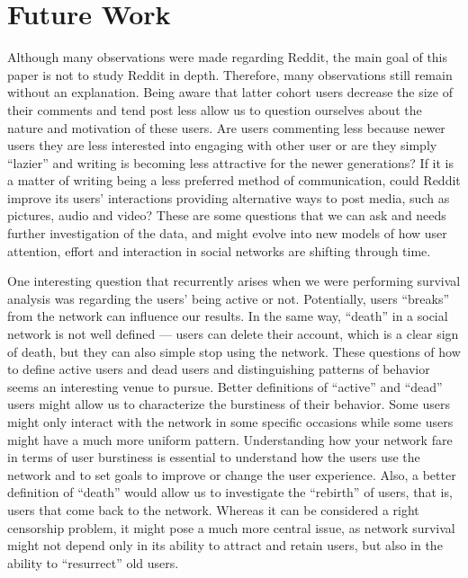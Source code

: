 	\section{Future Work}

Although many observations were made regarding Reddit, the main goal of this paper is not to study Reddit in depth. Therefore, many observations still remain without an explanation. Being aware that latter cohort users decrease the size of their comments and tend post less allow us to question ourselves about the nature and motivation of these users. Are users commenting less because newer users they are less interested into engaging with other user or are they simply ``lazier'' and writing is becoming less attractive for the newer generations? If it is a matter of writing being a less preferred method of communication, could Reddit improve its users' interactions providing alternative ways to post media, such as pictures, audio and video? These are some questions that we can ask and needs further investigation of the data, and might evolve into new models of how user attention, effort and interaction in social networks are shifting through time.

One interesting question that recurrently arises when we were performing survival analysis was regarding the users' being active or not. Potentially, users ``breaks'' from the network can influence our results. In the same way, ``death'' in a social network is not well defined --- users can delete their account, which is a clear sign of death, but they can also simple stop using the network. These questions of how to define active users and dead users and distinguishing patterns of behavior seems an interesting venue to pursue. Better definitions of ``active'' and ``dead'' users might allow us to characterize the burstiness of their behavior. Some users might only interact with the network in some specific occasions while some users might have a much more uniform pattern. Understanding how your network fare in terms of user burstiness is essential to understand how the users use the network and to set goals to improve or change the user experience. Also, a better definition of ``death'' would allow us to investigate the ``rebirth'' of users, that is, users that come back to the network. Whereas it can be considered a right censorship problem, it might pose a much more central issue, as network survival might not depend only in its ability to attract and retain users, but also in the ability to ``resurrect'' old users.



